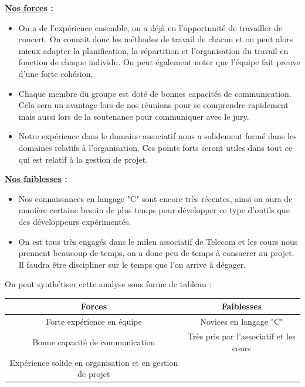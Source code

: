 \documentclass[a4paper, 12pt]{report}
\begin{document}
\textbf{\underline{Nos forces} :}
\begin{itemize}
    \item On a de l’expérience ensemble, on a déjà eu l'opportunité de travailler de concert. On connait donc les méthodes de travail de chacun et on peut alors mieux adapter la planification, la répartition et l'organisation du travail en fonction de chaque individu. On peut également noter que l'équipe fait preuve d'une forte cohésion.
    \item Chaque membre du groupe est doté de bonnes capacités de communication. Cela sera un avantage lors de nos réunions pour se comprendre rapidement mais aussi lors de la soutenance pour  communiquer avec le jury.
    \item Notre expérience dans le domaine associatif nous a solidement formé dans les domaines relatifs à l'organisation. Ces points forts seront utiles dans tout ce qui est relatif à la gestion de projet.
\end{itemize}
\bigskip

\textbf{\underline{Nos faiblesses} :}
\begin{itemize}
    \item Nos connaissances en langage "C" sont encore très récentes, ainsi on aura de manière certaine besoin de plus temps pour développer ce type d'outils que des développeurs expérimentés.
    \item On est tous très engagés dans le mileu associatif de Telecom et les cours nous prennent beaucoup de temps, on a donc peu de temps à consacrer au projet.  Il faudra être discipliner sur le temps que l'on arrive à dégager.
\end{itemize}
\clearpage

On peut synthétiser cette analyse sous forme de tableau :

\begin{table}[htbp]
    \centering\begin{tabular}{|c|c|}
        \hline
        \textcolor{mainColor}{Forces} & \textcolor{mainColor}{Faiblesses} \\
        \hline\hline
        Forte expérience en équipe & Novices en langage "C" \\
        \hline
        Bonne capacité de communication & Très pris par l'associatif et les cours \\
        \hline
        Expérience solide en organisation et en gestion de projet & \\
        \hline
    \end{tabular}
\end{table}
        
\end{document}
